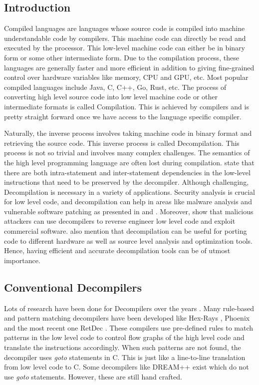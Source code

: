 \documentclass{article}
\begin{document}
\subsection{Introduction}
Compiled languages are languages whose source code is compiled into machine understandable code by compilers. This machine code can directly be read and executed by the processor. This low-level machine code can either be in binary form or some other intermediate form. Due to the compilation process, these languages are generally faster and more efficient in addition to giving fine-grained control over hardware variables like memory, CPU and GPU, etc. Most popular compiled languages include Java, C, C++, Go, Rust, etc. The process of converting high level source code into low level machine code or other intermediate formats is called Compilation. This is achieved by compilers and is pretty straight forward once we have access to the language specific compiler.

Naturally, the inverse process involves taking machine code in binary format and retrieving the source code. This inverse process is called Decompilation. This process is not so trivial and involves many complex challenges. The semantics of the high level programming language are often lost during compilation. \citet{coda} state that there are both intra-statement and inter-statement dependencies in the low-level instructions that need to be preserved by the decompiler. Although challenging, Decompilation is necessary in a variety of applications. Security analysis is crucial for low level code, and decompilation can help in areas like malware analysis and vulnerable software patching as presented in \citet{kolbitsch2009effective} and \citet{yakdan2016helping}. Moreover, \citet{lee2011tie} show that malicious attackers can use decompilers to reverse engineer low level code and exploit commercial software. \citet{katz2019towards} also mention that decompilation can be useful for porting code to different hardware as well as source level analysis and optimization tools. Hence, having efficient and accurate decompilation tools can be of utmost importance.

\subsection{Conventional Decompilers}
Lots of research have been done for Decompilers over the years \cite{cifuentes1994reverse, emmerik2004using,brumley2011bap,bao2014byteweight,rosenblum2008learning,yakdan2016helping,brumley2013native}. Many rule-based and pattern matching decompilers have been developed like Hex-Rays \cite{hexray}, Phoenix \cite{brumley2013native} and the most recent one RetDec \cite{kvroustek2017retdec}. These compilers use pre-defined rules to match patterns in the low level code to control flow graphs of the high level code and translate the instructions accordingly. When such patterns are not found, the decompiler uses \textit{goto} statements in C. This is just like a line-to-line translation from low level code to C. Some decompilers like DREAM++ \cite{yakdan2015no,yakdan2016helping} exist which do not use \textit{goto} statements. However, these are still hand crafted.
\end{document}
